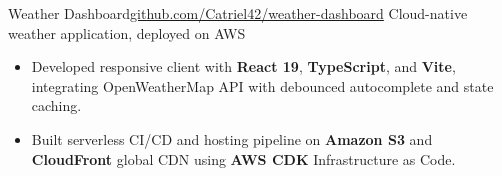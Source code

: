 \newpage
\resumeSubheading
{Weather Dashboard}{\href{https://github.com/Catriel42/weather-dashboard}{github.com/Catriel42/weather-dashboard}}
{Cloud-native weather application, deployed on AWS}
{}

\begin{itemize}
    \item Developed responsive client with \textbf{React 19}, \textbf{TypeScript}, and \textbf{Vite}, integrating OpenWeatherMap API with debounced autocomplete and state caching.
    \item Built serverless CI/CD and hosting pipeline on \textbf{Amazon S3} and \textbf{CloudFront} global CDN using \textbf{AWS CDK} Infrastructure as Code.
\end{itemize}

\resumeSubHeadingListEnd